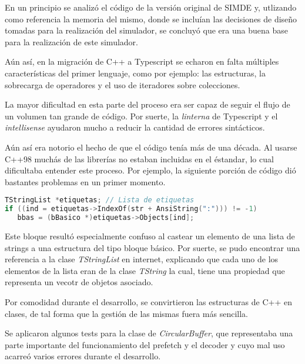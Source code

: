En un principio se analizó el código de la versión original de SIMDE\cite{SIMDE} y, utlizando como
referencia la memoria del mismo, donde se incluían las decisiones de diseño
tomadas para la realización del simulador, se concluyó que era una buena base para la realización 
de este simulador.

\bigskip
Aún así, en la migración de C++ a Typescript se echaron en falta múltiples características del primer lenguaje,
como por ejemplo: las estructuras, la sobrecarga de operadores y el uso de iteradores sobre colecciones.

\bigskip
La mayor dificultad en esta parte del proceso era ser capaz de seguir el flujo de un volumen tan grande
de código. Por suerte, la \textit{linterna} de Typescript y el \textit{intellisense} ayudaron mucho a reducir la cantidad
de errores sintácticos.

\bigskip
Aún así era notorio el hecho de que el código tenía más de una década. Al usarse C++98 muchás de las librerías
no estaban incluidas en el éstandar, lo cual dificultaba entender este proceso. Por ejemplo, la siguiente
porción de código dió bastantes problemas en un primer momento.

\begin{lstlisting}[language=C++]
TStringList *etiquetas; // Lista de etiquetas
if ((ind = etiquetas->IndexOf(str + AnsiString(":"))) != -1)
   bbas = (bBasico *)etiquetas->Objects[ind];
\end{lstlisting}

\bigskip
Este bloque resultó especialmente confuso al castear un elemento de una lista de strings 
a una estructura del tipo bloque básico. Por suerte, se pudo encontrar una referencia 
a la clase \textit{TStringList} en internet, explicando que cada uno de los elementos de la lista
eran de la clase \textit{TString} la cual, tiene una propiedad que representa un vecotr de objetos
asociado.\cite{TStringObjects} 

\bigskip
Por comodidad durante el desarrollo, se convirtieron las estructuras de C++ en clases, de tal forma
que la gestión de las mismas fuera más sencilla.

\bigskip
Se aplicaron algunos tests para la clase de \textit{CircularBuffer}, que representaba una parte importante
del funcionamiento del prefetch y el decoder y cuyo mal uso acarreó varios errores durante el desarrollo.